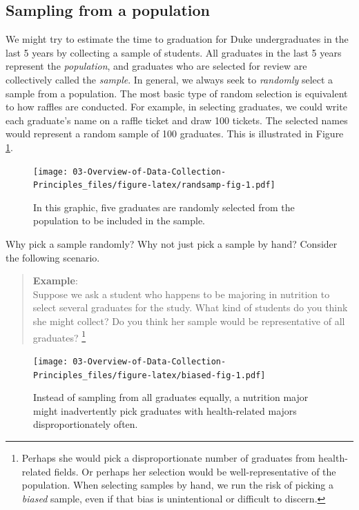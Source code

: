 \documentclass[
]{book}
\begin{document}
\hypertarget{sampling-from-a-population}{%
\subsection{Sampling from a population}\label{sampling-from-a-population}}

We might try to estimate the time to graduation for Duke undergraduates in the last 5 years by collecting a sample of students. All graduates in the last 5 years represent the \emph{population}, and graduates who are selected for review are collectively called the \emph{sample}. In general, we always seek to \emph{randomly} select a sample from a population. The most basic type of random selection is equivalent to how raffles are conducted. For example, in selecting graduates, we could write each graduate's name on a raffle ticket and draw 100 tickets. The selected names would represent a random sample of 100 graduates. This is illustrated in Figure \ref{fig:randsamp-fig}.

\begin{figure}
\centering
\texttt{[image: 03-Overview-of-Data-Collection-Principles\_files/figure-latex/randsamp-fig-1.pdf]}
\caption{\label{fig:randsamp-fig}In this graphic, five graduates are randomly selected from the population to be included in the sample.}
\end{figure}

Why pick a sample randomly? Why not just pick a sample by hand? Consider the following scenario.

\begin{quote}
\textbf{Example}:\\
Suppose we ask a student who happens to be majoring in nutrition to select several graduates for the study. What kind of students do you think she might collect? Do you think her sample would be representative of all graduates?
\footnote{Perhaps she would pick a disproportionate number of graduates from health-related fields. Or perhaps her selection would be well-representative of the population. When selecting samples by hand, we run the risk of picking a \emph{biased} sample, even if that bias is unintentional or difficult to discern.}
\end{quote}

\begin{figure}
\centering
\texttt{[image: 03-Overview-of-Data-Collection-Principles\_files/figure-latex/biased-fig-1.pdf]}
\caption{\label{fig:biased-fig}Instead of sampling from all graduates equally, a nutrition major might inadvertently pick graduates with health-related majors disproportionately often.}
\end{figure}
\end{document}
